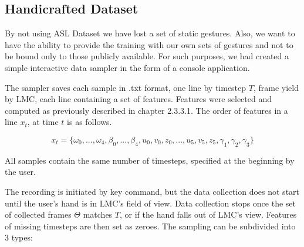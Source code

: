 \subsection{Handicrafted Dataset}

By not using ASL Dataset we have lost a set of static gestures. Also, we want to have the ability to provide the training with our own sets of gestures and not to be bound only to those publicly available. For such purposes, we had created a simple interactive data sampler in the form of a console application.

The sampler saves each sample in .txt format, one line by timestep $T$, frame yield by LMC, each line containing a set of features. Features were selected and computed as previously described in chapter 2.3.3.1. The order of features in a line $x_t$, at time $t$ is as follows.


\begin{equation}
	{x_t = \{\omega_0, ...,\omega_4, \beta_0, ..., \beta_4, u_0,v_0,z_0, ..., u_5,v_5,z_5, \gamma_1, \gamma_2, \gamma_3\}}
\end{equation}



All samples contain the same number of timesteps, specified at the beginning by the user. 

The recording is initiated by key command, but the data collection does not start until the user's hand is in LMC's field of view. Data collection stops once the set of collected frames $\Theta$ matches $T$, or if the hand falls out of LMC's view. Features of missing timesteps are then set as zeroes. The sampling can be subdivided into 3 types:

